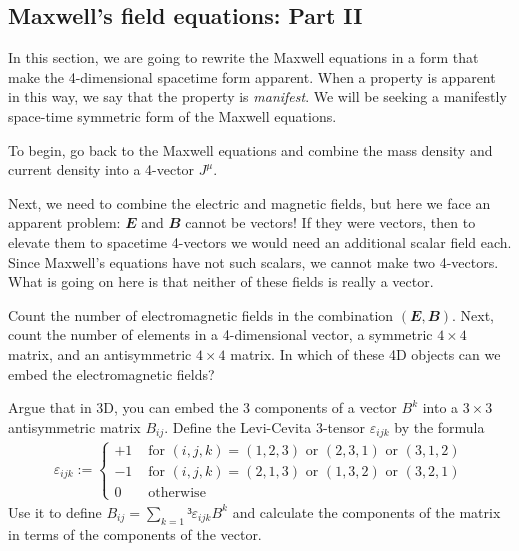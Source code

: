 \subsection{Maxwell's field equations: Part II}
In this section, we are going to rewrite the Maxwell equations in a form that make the 4-dimensional spacetime form apparent. When a property is apparent in this way, we say that the property is {\em manifest}. We will be seeking a manifestly space-time symmetric form of the Maxwell equations. 
\begin{exercise}
To begin, go back to the Maxwell equations and combine the mass density and current density into a 4-vector $J^μ$. 
\end{exercise}
Next, we need to combine the electric and magnetic fields, but here we face an apparent problem: $𝑬$ and $𝑩$ cannot be vectors! If they were vectors, then to elevate them to spacetime 4-vectors we would need an additional scalar field each. Since Maxwell's equations have not such scalars, we cannot make two 4-vectors. What is going on here is that neither of these fields is really a vector. 
\begin{exercise}
Count the number of electromagnetic fields in the combination $(𝑬,𝑩)$. Next, count the number of elements in a 4-dimensional vector, a symmetric $4×4$ matrix, and an antisymmetric $4×4$ matrix. In which of these 4D objects can we embed the electromagnetic fields?
\end{exercise}
\begin{exercise}
Argue that in 3D, you can embed the 3 components of a vector $B^k$ into a $3×3$ antisymmetric matrix $B_{ij}$. Define the Levi-Cevita 3-tensor $𝜀_{ijk}$ by the formula 
\begin{eqnarray}
𝜀_{ijk} := \begin{cases}
	+1 & \textrm{ for } (i,j,k)=(1,2,3) \textrm{ or } (2,3,1) \textrm{ or } (3,1,2)\\
	-1 & \textrm{ for } (i,j,k)=(2,1,3) \textrm{ or } (1,3,2) \textrm{ or } (3,2,1)\\
	0 & \textrm{ otherwise }
\end{cases}
\end{eqnarray}
Use it to define $B_{ij} = ∑_{k=1}³ 𝜀_{ijk} B^k$ and calculate the components of the matrix in terms of the components of the vector. 
\end{exercise}

